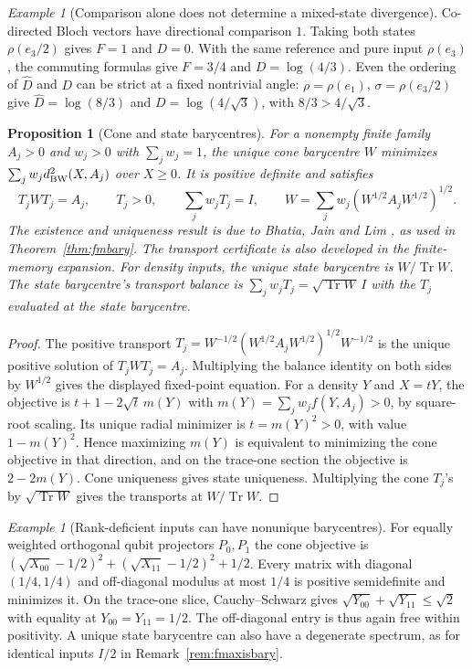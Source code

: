 \documentclass[aps,pra,onecolumn,superscriptaddress,nofootinbib,10pt]{revtex4-2}
\newtheorem{proposition}[theorem]{Proposition}
\theoremstyle{definition}
\theoremstyle{remark}
\newtheorem{example}[theorem]{Example}
\newcommand{\tr}{\operatorname{Tr}}
\begin{document}
\begin{example}[Comparison alone does not determine a mixed-state divergence]
\label{ob:divergencecounter}
Co-directed Bloch vectors have directional comparison \(1\).
Taking both states \(\rho(e_3/2)\) gives \(F=1\) and \(D=0\). With
the same reference and pure input \(\rho(e_3)\), the commuting
formulas give \(F=3/4\) and \(D=\log(4/3)\). Even the ordering of
\(\widehat D\) and \(D\) can be strict at a fixed nontrivial angle:
\(\rho=\rho(e_1)\), \(\sigma=\rho(e_3/2)\) give
\(\widehat D=\log(8/3)\) and \(D=\log(4/\sqrt3)\), with
\(8/3>4/\sqrt3\).
\end{example}

\begin{proposition}[Cone and state barycentres]\label{ob:barycentres}
For a nonempty finite family \(A_j>0\) and \(w_j>0\) with
\(\sum_j w_j=1\), the unique cone barycentre \(W\) minimizes
\(\sum_j w_j d_{\rm BW}^2(X,A_j)\) over \(X\ge0\). It is positive definite
and satisfies
\[
 T_jWT_j=A_j,\qquad T_j>0,\qquad \sum_jw_jT_j=I,\qquad
 W=\sum_jw_j(W^{1/2}A_jW^{1/2})^{1/2}.
\]
The existence and uniqueness result is due to Bhatia, Jain and Lim
\cite[Theorem~8 and Eq.~(57)]{n2-bjl}, as used in
Theorem~\ref{thm:fmbary}. The transport certificate is also developed
in the finite-memory expansion. For density inputs, the unique state
barycentre is \(W/\tr W\). The state barycentre's transport balance is
\(\sum_jw_j T_j=\sqrt{\tr W}\,I\) with the \(T_j\) evaluated at the
state barycentre.
\end{proposition}
\begin{proof}
The positive transport \(T_j=W^{-1/2}(W^{1/2}A_jW^{1/2})^{1/2}W^{-1/2}\)
is the unique positive solution of \(T_jWT_j=A_j\). Multiplying the
balance identity on both sides by \(W^{1/2}\) gives the displayed
fixed-point equation. For a density \(Y\) and \(X=tY\),
the objective is \(t+1-2\sqrt t\,m(Y)\) with
\(m(Y)=\sum_j w_j f(Y,A_j)>0\), by square-root scaling.
Its unique radial minimizer is \(t=m(Y)^2>0\), with value
\(1-m(Y)^2\). Hence maximizing \(m(Y)\) is equivalent to minimizing
the cone objective in that direction, and on the trace-one section
the objective is \(2-2m(Y)\). Cone uniqueness gives state uniqueness.
Multiplying the cone \(T_j\)'s by \(\sqrt{\tr W}\) gives the transports
at \(W/\tr W\).
\end{proof}

\begin{example}[Rank-deficient inputs can have nonunique barycentres]
\label{ob:singularbarycentre}
For equally weighted orthogonal qubit projectors \(P_0,P_1\) the
cone objective is
\((\sqrt{X_{00}}-1/2)^2+(\sqrt{X_{11}}-1/2)^2+1/2\).
Every matrix with diagonal \((1/4,1/4)\) and off-diagonal modulus at
most \(1/4\) is positive semidefinite and minimizes it. On the trace-one
slice, Cauchy--Schwarz gives \(\sqrt{Y_{00}}+\sqrt{Y_{11}}\le\sqrt2\)
with equality at \(Y_{00}=Y_{11}=1/2\). The off-diagonal entry is thus
again free within positivity. A unique state barycentre can also have
a degenerate spectrum, as for identical inputs \(I/2\) in
Remark~\ref{rem:fmaxisbary}.
\end{example}
\end{document}
